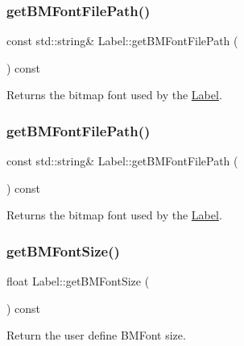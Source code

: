 \subsubsection{\texorpdfstring{get\+B\+M\+Font\+File\+Path()}{getBMFontFilePath()}\hspace{0.1cm}{\footnotesize\ttfamily [1/2]}}
{\footnotesize\ttfamily const std\+::string\& Label\+::get\+B\+M\+Font\+File\+Path (\begin{DoxyParamCaption}{ }\end{DoxyParamCaption}) const\hspace{0.3cm}{\ttfamily [inline]}}

Returns the bitmap font used by the \hyperlink{classLabel}{Label}. \mbox{\label{classLabel_a30dc940bd64a7b34f7facee0c9c8d2ab}} 
\subsubsection{\texorpdfstring{get\+B\+M\+Font\+File\+Path()}{getBMFontFilePath()}\hspace{0.1cm}{\footnotesize\ttfamily [2/2]}}
{\footnotesize\ttfamily const std\+::string\& Label\+::get\+B\+M\+Font\+File\+Path (\begin{DoxyParamCaption}{ }\end{DoxyParamCaption}) const\hspace{0.3cm}{\ttfamily [inline]}}

Returns the bitmap font used by the \hyperlink{classLabel}{Label}. \mbox{\label{classLabel_a296763fd55fbde90fdec27bbc563a119}} 
\subsubsection{\texorpdfstring{get\+B\+M\+Font\+Size()}{getBMFontSize()}\hspace{0.1cm}{\footnotesize\ttfamily [1/2]}}
{\footnotesize\ttfamily float Label\+::get\+B\+M\+Font\+Size (\begin{DoxyParamCaption}{ }\end{DoxyParamCaption}) const}

Return the user define B\+M\+Font size.

